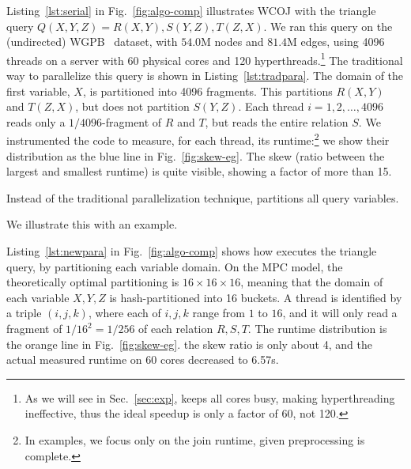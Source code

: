 \begin{example} \label{ex:intro:1} Listing~\ref{lst:serial} in
  Fig.~\ref{fig:algo-comp} illustrates WCOJ with the triangle query
  $Q(X,Y,Z) = R(X,Y), S(Y,Z), T(Z,X)$.  We ran this query on the
  (undirected) WGPB~\cite{wgpb-dataset, DBLP:conf/semweb/HoganRRS19} dataset, with $54.0$M nodes and $81.4$M edges,
  using 4096 threads on a server with 60 physical cores and 120
  hyperthreads.\footnote{As we will see in Sec.~\ref{sec:exp}, \name keeps all cores busy, making hyperthreading ineffective, thus the ideal speedup is only a factor of 60, not 120.}  The traditional
  way to parallelize this query is shown in
  Listing~\ref{lst:tradpara}.  The domain of the first variable, $X$,
  is partitioned into 4096 fragments.  This partitions $R(X,Y)$ and
  $T(Z,X)$, but does not partition $S(Y,Z)$.  Each thread
  $i=1,2,\ldots,4096$ reads only a $1/4096$-fragment of $R$ and $T$,
  but reads the entire relation $S$.  We instrumented the code to
  measure, for each thread, its runtime:\footnote{In examples, we focus only on the join runtime,  given preprocessing is complete.} we show their distribution as
  the blue line in Fig.~\ref{fig:skew-eg}.  The skew (ratio between
  the largest and smallest runtime) is quite visible, showing a factor
  of more than 15. 
  
  
\end{example}

Instead of the traditional parallelization technique, \name partitions
all query variables.

We illustrate this with an
example.

\begin{example} \label{ex:intro:2} Listing~\ref{lst:newpara} in
  Fig.~\ref{fig:algo-comp} shows how \name executes the triangle
  query, by partitioning each variable domain.  On the MPC model, the
  theoretically optimal partitioning is $16\times 16\times 16$,
  meaning that the domain of each variable $X, Y, Z$ is
  hash-partitioned into 16 buckets.  A thread is identified by a
  triple $(i,j,k)$, where each of $i,j,k$ range from $1$ to $16$, and
  it will only read a fragment of $1/16^2 = 1/256$ of each relation
  $R, S, T$.  The runtime distribution is the orange line in
  Fig.~\ref{fig:skew-eg}.  the skew
  ratio is only about 4, and the actual measured runtime on 60 cores
  decreased to 6.57s.  

\end{example}

